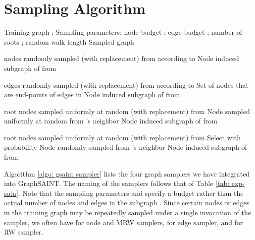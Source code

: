 \documentclass{article} \usepackage{iclr2020_conference,times}
\newcommand{\graphsaint}{{\fontfamily{lmtt}\selectfont GraphSAINT}}
\begin{document}
\section{Sampling Algorithm}
\label{sec: sampler algo}

\begin{algorithm}
\caption{Graph sampling algorithms by {\graphsaint}}
\label{algo: gsaint sampler}
\begin{algorithmic}[1]
\renewcommand{\algorithmicrequire}{\textbf{Input:}}
\renewcommand{\algorithmicensure}{\textbf{Output:}}
\Require Training graph ; Sampling parameters: node budget ; edge budget ; number of roots ; random walk length 
\Ensure Sampled graph 

\State 
\State   nodes randomly sampled (with replacement) from  according to 
\State  Node induced subgraph of  from 
\EndFunction

\State 
\State   edges randomly sampled (with replacement) from  according to 
\State  Set of nodes that are end-points of edges in 
\State  Node induced subgraph of  from 
\EndFunction

\State   root nodes sampled uniformly at random (with replacement) from 
\State 
\For{}
    \State 
        \State  Node sampled uniformly at random from 's neighbor
        \State 
    \EndFor
\EndFor
\State  Node induced subgraph of  from 
\EndFunction

\State   root nodes sampled uniformly at random (with replacement) from 
\State 
{}
\State Select  with probability 
    \State  Node randomly sampled from 's neighbor 
    \State 
    \State 
\EndFor
\State  Node induced subgraph of  from 
\EndFunction
\end{algorithmic} 
\end{algorithm}

Algorithm \ref{algo: gsaint sampler} lists the four graph samplers we have integrated into {\graphsaint}. The naming of the samplers follows that of Table \ref{tab: exp-sota}. 
Note that the sampling parameters  and  specify a budget rather than the actual number of nodes and edges in the subgraph . 
Since certain nodes or edges in the training graph  may be repeatedly sampled under a single invocation of the sampler, we often have  for node and MRW samplers,  for edge sampler, and  for RW sampler. 
\end{document}
